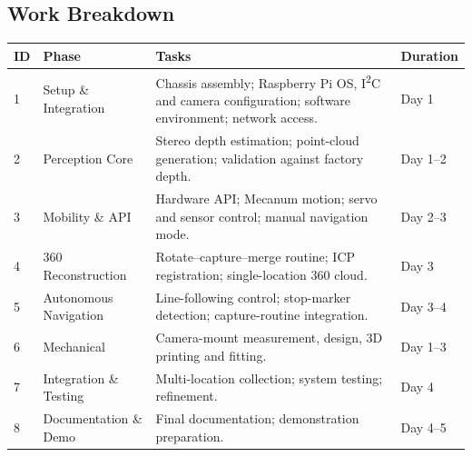 \documentclass[11pt,a4paper]{article}
\begin{document}
\subsection{Work Breakdown}
\begin{center}
\small
\begin{tabularx}{\linewidth}{@{}p{0.7cm}p{3.4cm}Xp{1.6cm}@{}}
\toprule
\textbf{ID} & \textbf{Phase} & \textbf{Tasks} & \textbf{Duration}\\
\midrule
\rowcolor{rowgray} 1 & Setup \& Integration & Chassis assembly; Raspberry Pi OS, I\textsuperscript{2}C and camera configuration; software environment; network access. & Day 1\\
2 & Perception Core & Stereo depth estimation; point-cloud generation; validation against factory depth. & Day 1--2\\
\rowcolor{rowgray} 3 & Mobility \& API & Hardware API; Mecanum motion; servo and sensor control; manual navigation mode. & Day 2--3\\
4 & 360\textdegree{} Reconstruction & Rotate--capture--merge routine; ICP registration; single-location 360\textdegree{} cloud. & Day 3\\
\rowcolor{rowgray} 5 & Autonomous Navigation & Line-following control; stop-marker detection; capture-routine integration. & Day 3--4\\
6 & Mechanical & Camera-mount measurement, design, 3D printing and fitting. & Day 1--3\\
\rowcolor{rowgray} 7 & Integration \& Testing & Multi-location collection; system testing; refinement. & Day 4\\
8 & Documentation \& Demo & Final documentation; demonstration preparation. & Day 4--5\\
\bottomrule
\end{tabularx}
\end{center}
\end{document}

